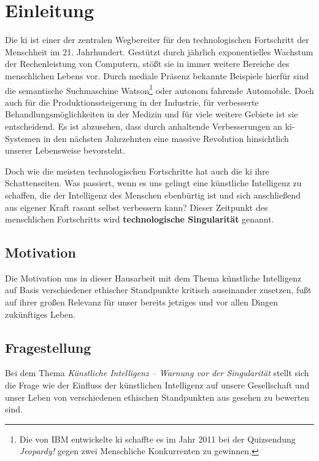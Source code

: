 \section{Einleitung}
Die \ac{ki} ist einer der zentralen Wegbereiter für den technologischen Fortschritt der Menschheit im 21. Jahrhundert.
Gestützt durch jährlich exponentielles Wachstum der Rechenleistung von Computern, stößt sie in immer weitere Bereiche des menschlichen Lebens vor.
Durch mediale Präsenz bekannte Beispiele hierfür sind die semantische Suchmaschine Watson\footnote{Die von IBM entwickelte \ac{ki} schaffte es im Jahr 2011 bei der Quizsendung \textit{Jeopardy!} gegen zwei Menschliche Konkurrenten zu gewinnen.} oder autonom fahrende Automobile. %
Doch auch für die Produktionssteigerung in der Industrie, für verbesserte Behandlungsmöglichkeiten in der Medizin und für viele weitere Gebiete ist sie entscheidend.
Es ist abzusehen, dass durch anhaltende Verbesserungen an \ac{ki}-Systemen in den nächsten Jahrzehnten eine massive Revolution hinsichtlich unserer Lebensweise bevorsteht.

Doch wie die meisten technologischen Fortschritte hat auch die \ac{ki} ihre Schattenseiten.
Was passiert, wenn es uns gelingt eine künstliche Intelligenz zu schaffen, die der Intelligenz des Menschen ebenbürtig ist und sich anschließend aus eigener Kraft rasant selbst verbessern kann?
Dieser Zeitpunkt des menschlichen Fortschritts wird \textbf{technologische Singularität} genannt.

\subsection{Motivation}
Die Motivation uns in dieser Hausarbeit mit dem Thema \flqq künstliche Intelligenz\frqq{} auf Basis verschiedener ethischer Standpunkte kritisch auseinander zusetzen, fußt auf ihrer großen Relevanz für unser bereits jetziges und vor allen Dingen zukünftiges Leben.

\subsection{Fragestellung}
Bei dem Thema \textit{Künstliche Intelligenz -- Warnung vor der Singularität} stellt sich die Frage wie der Einfluss der künstlichen Intelligenz auf unsere Gesellschaft und unser Leben von verschiedenen ethischen Standpunkten aus gesehen zu bewerten sind.


